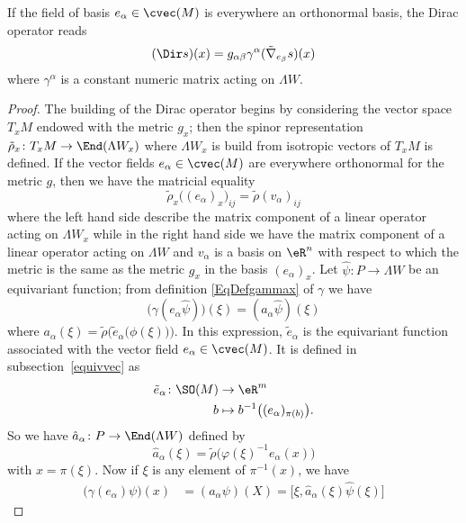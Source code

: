 \begin{proposition}
If the field of basis $e_{\alpha}\in\cvec(M)$ is everywhere an orthonormal basis, the Dirac operator reads
\begin{equation}
(\Dir s)(x)=g_{\alpha\beta}\gamma^{\alpha}(\tilde\nabla_{e_{\beta}}s)(x)
\end{equation}
where $\gamma^{\alpha}$ is a constant numeric matrix acting on $\Lambda W$.
\end{proposition}

\begin{proof}
The building of the Dirac operator begins by considering the vector space $T_xM$ endowed with the metric $g_x$; then the spinor representation $\tilde\rho_x\colon T_xM\to \End(\Lambda W_x)$ where $\Lambda W_x$ is build from isotropic vectors of $T_xM$ is defined. If the vector fields $e_{\alpha}\in\cvec(M)$ are everywhere orthonormal for the metric $g$, then we have the matricial equality
\begin{equation}
	\tilde\rho_x\big( (e_{\alpha})_x \big)_{ij}=\tilde\rho(v_{\alpha})_{ij}
\end{equation}
where the left hand side describe the matrix component of a linear operator acting on $\Lambda W_x$ while in the right hand side we have the matrix component of a linear operator acting on $\Lambda W$ and $v_{\alpha}$ is a basis on $\eR^n$ with respect to which the metric is the same as the metric $g_x$ in the basis $(e_{\alpha})_x$. Let $\hat{\psi}\colon P\to \Lambda W$ be an equivariant function; from definition \eqref{EqDefgammax} of $\gamma$ we have
\[
  \big( \gamma(e_{\alpha}\hat{\psi}) \big)(\xi)=(a_{\alpha}\hat{\psi})(\xi)
\]
where $a_{\alpha}(\xi)=\tilde\rho\Big( \tilde{e}_{\alpha}\big( \phi(\xi) \big) \Big)$. In this expression, $\tilde{e}_{\alpha}$ is the equivariant function associated with the vector field $e_{\alpha}\in\cvec(M)$. It is defined in subsection~\ref{equivvec} as
\begin{equation}
\begin{aligned}
 \tilde{e}_{\alpha}\colon \SO(M)&\to \eR^m \\
b&\mapsto b^{-1}\big( (e_{\alpha})_{\pi(b)} \big).
\end{aligned}
\end{equation}
So we have $\hat a_{\alpha}\colon P\to \End(\Lambda W)$ defined by
\[
  \hat a_{\alpha}(\xi)=\tilde\rho\big( \varphi(\xi)^{-1}e_{\alpha}(x) \big)
\]
with $x=\pi(\xi)$. Now if $\xi$ is any element of $\pi^{-1}(x)$, we have
\begin{align*}
\big( \gamma(e_{\alpha})\psi \big)(x)&=(a_{\alpha}\psi)(X)=\big[ \xi,\hat a_{\alpha}(\xi)\hat\psi(\xi) \big]

\end{align*}
\end{proof}
